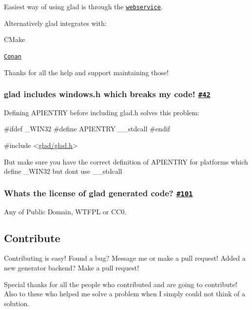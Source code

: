 Easiest way of using glad is through the \href{https://glad.dav1d.de}{\tt webservice}.

Alternatively glad integrates with\+:


\begin{DoxyItemize}
\item {\ttfamily C\+Make}
\item \href{https://bintray.com/bincrafters/public-conan/glad%3Abincrafters}{\tt Conan} ~\newline
\href{https://bintray.com/bincrafters/public-conan/glad%3Abincrafters/_latestVersion}{\tt }
\end{DoxyItemize}

Thanks for all the help and support maintaining those!

\subsubsection*{glad includes windows.\+h which breaks my code! \href{https://github.com/Dav1dde/glad/issues/42}{\tt \#42}}

Defining {\ttfamily A\+P\+I\+E\+N\+T\+RY} before including {\ttfamily glad.\+h} solves this problem\+:


\begin{DoxyCode}
\textcolor{preprocessor}{#ifdef \_WIN32}
\textcolor{preprocessor}{    #define APIENTRY \_\_stdcall}
\textcolor{preprocessor}{#endif}

\textcolor{preprocessor}{#include <\mbox{\hyperlink{glad_8h}{glad/glad.h}}>}
\end{DoxyCode}


But make sure you have the correct definition of {\ttfamily A\+P\+I\+E\+N\+T\+RY} for platforms which define {\ttfamily \+\_\+\+W\+I\+N32} but don\textquotesingle{}t use {\ttfamily \+\_\+\+\_\+stdcall}

\subsubsection*{What\textquotesingle{}s the license of glad generated code? \href{https://github.com/Dav1dde/glad/issues/101}{\tt \#101}}

Any of Public Domain, W\+T\+F\+PL or C\+C0.

\subsection*{Contribute}

Contributing is easy! Found a bug? Message me or make a pull request! Added a new generator backend? Make a pull request!

Special thanks for all the people who contributed and are going to contribute! Also to these who helped me solve a problem when I simply could not think of a solution. 